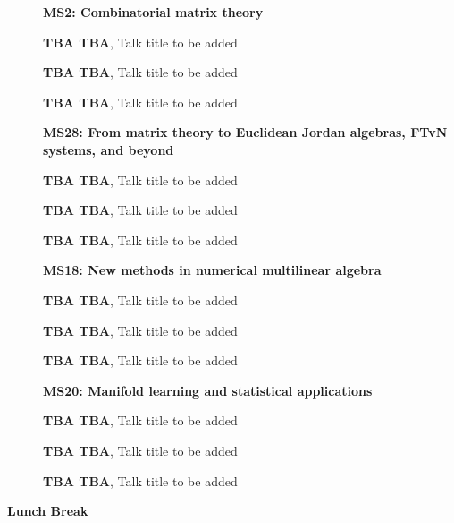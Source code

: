 \documentclass[ILAS2025-program.tex]{subfiles}
\begin{document}
\begin{description}
\begin{description}
        \end{description}
    \begin{description}
    \item[] \textbf{MS2: Combinatorial matrix theory} 
    \item[] \textbf{TBA TBA}, Talk title to be added
        \item[] \textbf{TBA TBA}, Talk title to be added
        \item[] \textbf{TBA TBA}, Talk title to be added
        \end{description}
    \begin{description}
    \item[] \textbf{MS28: From matrix theory to Euclidean Jordan algebras, FTvN systems, and beyond} 
    \item[] \textbf{TBA TBA}, Talk title to be added
        \item[] \textbf{TBA TBA}, Talk title to be added
        \item[] \textbf{TBA TBA}, Talk title to be added
        \end{description}
    \begin{description}
    \item[] \textbf{MS18: New methods in numerical multilinear algebra} 
    \item[] \textbf{TBA TBA}, Talk title to be added
        \item[] \textbf{TBA TBA}, Talk title to be added
        \item[] \textbf{TBA TBA}, Talk title to be added
        \end{description}
    \begin{description}
    \item[] \textbf{MS20: Manifold learning and statistical applications} 
    \item[] \textbf{TBA TBA}, Talk title to be added
        \item[] \textbf{TBA TBA}, Talk title to be added
        \item[] \textbf{TBA TBA}, Talk title to be added
        \end{description}
    \item[\info{12:00\textrm{--}13:30}] \textbf{Lunch Break} \info{}

\end{description}
\end{document}
